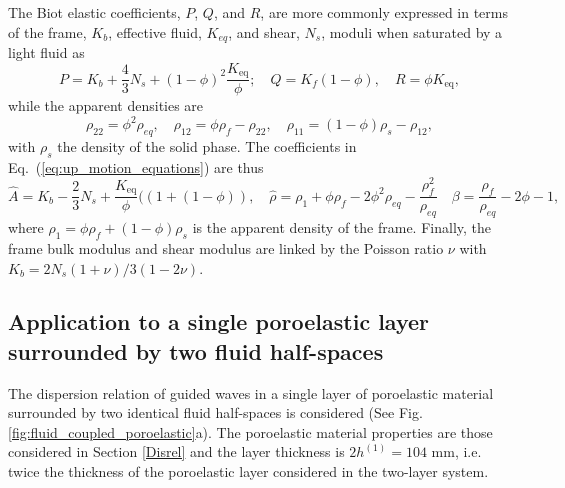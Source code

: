 The Biot elastic coefficients, $P$, $Q$, and $R$, are more commonly expressed in terms of the frame, $K_b$, effective fluid, $K_{eq}$, and shear, $N_s$, moduli when saturated by a light fluid as
\begin{equation}
P = K_b + \frac{4}{3} N_s + (1 - \phi)^2 \frac{K_{\text{eq}}}{\phi}; \quad Q = K_f(1- \phi), \quad R = \phi K_{\text{eq}},
\end{equation}
while the apparent densities are
\begin{equation}
\rho_{22}=\phi^{2} \rho_{eq}, \quad
\rho_{12}=\phi \rho_f-\rho_{22}, \quad
\rho_{11}=(1 - \phi) \rho_s-\rho_{12},
\end{equation}
 with $\rho_s$ the density of the solid phase.
The coefficients in Eq.~(\ref{eq:up_motion_equations}) are thus
\begin{equation}
    \hat A = K_b - \frac 2 3 N_s + \frac{K_{\text{eq}}}{\phi} ( \left( 1 + (1 - \phi) \right), \quad \hat \rho = \rho_1 + \phi \rho_f - 2 \phi^2\rho_{eq} - \frac{\rho_f^2}{\rho_{eq}}\quad
    \beta = \frac{\rho_f }{\rho_{eq}} - 2 \phi - 1, 
\end{equation}
where $\rho_1= \phi \rho_f + (1-\phi )\rho_s$ is 
the apparent density of the frame. Finally, the frame bulk modulus and shear modulus are linked by the Poisson ratio $\nu$ with $K_b=2N_s(1+\nu)/3(1-2\nu)$.

\subsection{Application to a single poroelastic layer surrounded by two fluid half-spaces}\label{app:fluid_coupled_poroelastic}
 
The dispersion relation of guided waves in a single layer of poroelastic material surrounded by two identical fluid half-spaces is considered (See Fig.\ref{fig:fluid_coupled_poroelastic}a). The poroelastic material properties are those considered in Section \ref{Disrel} and the layer thickness is $2h^{(1)}=104\textrm{ mm}$, i.e. twice the thickness of the poroelastic layer considered in the two-layer system.

